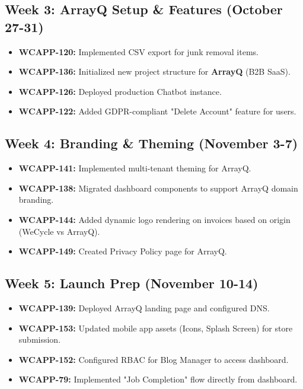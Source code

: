 \subsection{Week 3: ArrayQ Setup \& Features (October 27-31)}
\begin{itemize}
    \item \textbf{WCAPP-120:} Implemented CSV export for junk removal items.
    \item \textbf{WCAPP-136:} Initialized new project structure for \textbf{ArrayQ} (B2B SaaS).
    \item \textbf{WCAPP-126:} Deployed production Chatbot instance.
    \item \textbf{WCAPP-122:} Added GDPR-compliant "Delete Account" feature for users.
\end{itemize}

\subsection{Week 4: Branding \& Theming (November 3-7)}
\begin{itemize}
    \item \textbf{WCAPP-141:} Implemented multi-tenant theming for ArrayQ.
    \item \textbf{WCAPP-138:} Migrated dashboard components to support ArrayQ domain branding.
    \item \textbf{WCAPP-144:} Added dynamic logo rendering on invoices based on origin (WeCycle vs ArrayQ).
    \item \textbf{WCAPP-149:} Created Privacy Policy page for ArrayQ.
\end{itemize}

\subsection{Week 5: Launch Prep (November 10-14)}
\begin{itemize}
    \item \textbf{WCAPP-139:} Deployed ArrayQ landing page and configured DNS.
    \item \textbf{WCAPP-153:} Updated mobile app assets (Icons, Splash Screen) for store submission.
    \item \textbf{WCAPP-152:} Configured RBAC for Blog Manager to access dashboard.
    \item \textbf{WCAPP-79:} Implemented "Job Completion" flow directly from dashboard.
\end{itemize}

